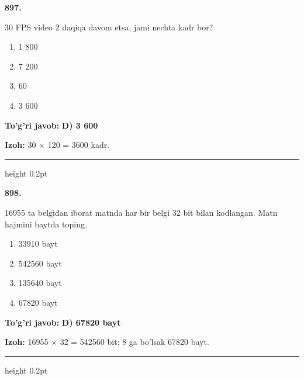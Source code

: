 \documentclass[10pt,a4paper,oneside]{article}
\begin{document}
\noindent\textbf{\color{ink}897.}
\par
30 FPS video 2 daqiqa davom etsa, jami nechta kadr bor?
\begin{enumerate}[label=\Alph*),leftmargin=9mm]
\item 1 800
\item 7 200
\item 60
\item 3 600
\end{enumerate}
\begin{tcolorbox}[enhanced,breakable,colback=teal!4,colframe=teal!50!black,boxrule=0.5pt,arc=1.1mm,left=3mm,right=3mm,top=1.7mm,bottom=1.7mm,before skip=2mm,after skip=2mm]
\textbf{\color{teal}To'g'ri javob:} \textbf{D) 3 600}
\par\smallskip
\textbf{Izoh:} 30 \ensuremath{\times} 120 = 3600 kadr.
\end{tcolorbox}
\vspace{2mm}\hrule height 0.2pt \vspace{3mm}

\noindent\textbf{\color{ink}898.}
\par
16955 ta belgidan iborat matnda har bir belgi 32 bit bilan kodlangan. Matn hajmini baytda toping.
\begin{enumerate}[label=\Alph*),leftmargin=9mm]
\item 33910 bayt
\item 542560 bayt
\item 135640 bayt
\item 67820 bayt
\end{enumerate}
\begin{tcolorbox}[enhanced,breakable,colback=teal!4,colframe=teal!50!black,boxrule=0.5pt,arc=1.1mm,left=3mm,right=3mm,top=1.7mm,bottom=1.7mm,before skip=2mm,after skip=2mm]
\textbf{\color{teal}To'g'ri javob:} \textbf{D) 67820 bayt}
\par\smallskip
\textbf{Izoh:} 16955 \ensuremath{\times} 32 = 542560 bit; 8 ga bo'lsak 67820 bayt.
\end{tcolorbox}
\vspace{2mm}\hrule height 0.2pt \vspace{3mm}
\end{document}
